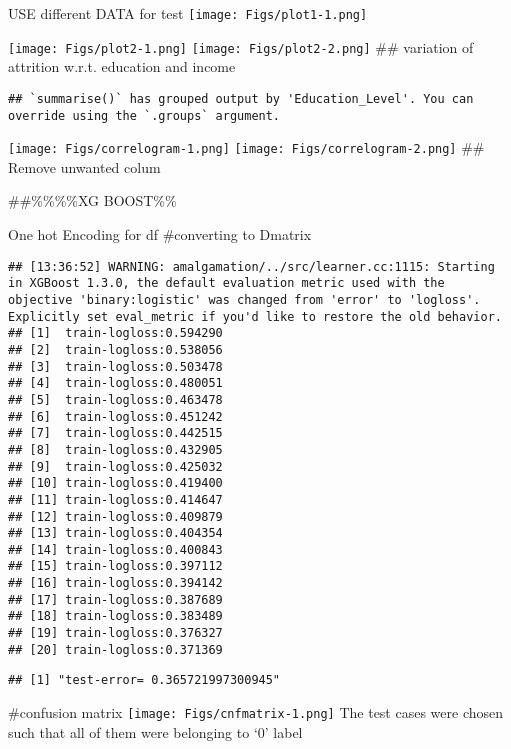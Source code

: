 \documentclass[
  ignorenonframetext,
]{beamer}
\begin{document}
\begin{frame}[fragile]{USE different DATA for test}
\texttt{[image: Figs/plot1-1.png]}

\texttt{[image: Figs/plot2-1.png]} \texttt{[image: Figs/plot2-2.png]}
\#\# variation of attrition w.r.t. education and income

\begin{verbatim}
## `summarise()` has grouped output by 'Education_Level'. You can override using the `.groups` argument.
\end{verbatim}

\texttt{[image: Figs/correlogram-1.png]}
\texttt{[image: Figs/correlogram-2.png]} \#\# Remove unwanted colum

\#\#\%\%\%\%XG BOOST\%\%

\begin{block}{One hot Encoding for df}
\protect\hypertarget{one-hot-encoding-for-df}{}
\#converting to Dmatrix

\begin{verbatim}
## [13:36:52] WARNING: amalgamation/../src/learner.cc:1115: Starting in XGBoost 1.3.0, the default evaluation metric used with the objective 'binary:logistic' was changed from 'error' to 'logloss'. Explicitly set eval_metric if you'd like to restore the old behavior.
## [1]  train-logloss:0.594290 
## [2]  train-logloss:0.538056 
## [3]  train-logloss:0.503478 
## [4]  train-logloss:0.480051 
## [5]  train-logloss:0.463478 
## [6]  train-logloss:0.451242 
## [7]  train-logloss:0.442515 
## [8]  train-logloss:0.432905 
## [9]  train-logloss:0.425032 
## [10] train-logloss:0.419400 
## [11] train-logloss:0.414647 
## [12] train-logloss:0.409879 
## [13] train-logloss:0.404354 
## [14] train-logloss:0.400843 
## [15] train-logloss:0.397112 
## [16] train-logloss:0.394142 
## [17] train-logloss:0.387689 
## [18] train-logloss:0.383489 
## [19] train-logloss:0.376327 
## [20] train-logloss:0.371369
\end{verbatim}

\begin{verbatim}
## [1] "test-error= 0.365721997300945"
\end{verbatim}

\#confusion matrix \texttt{[image: Figs/cnfmatrix-1.png]} The test cases
were chosen such that all of them were belonging to `0' label
\end{block}
\end{frame}
\end{document}
